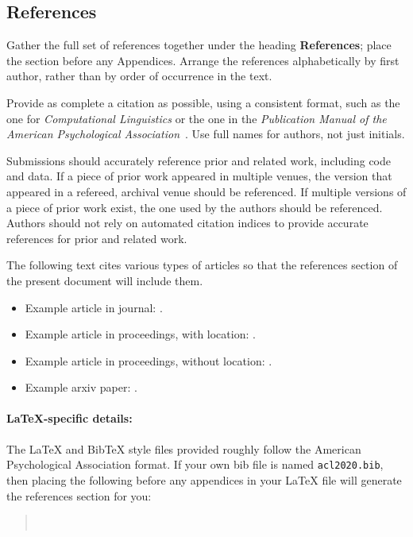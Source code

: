 \documentclass[11pt,a4paper]{article}
\begin{document}
\subsection{References}
Gather the full set of references together under the heading \textbf{References}; place the section before any Appendices. 
Arrange the references alphabetically by first author, rather than by order of occurrence in the text.

Provide as complete a citation as possible, using a consistent format, such as the one for \emph{Computational Linguistics\/} or the one in the  \emph{Publication Manual of the American 
Psychological Association\/}~\citep{APA:83}.
Use full names for authors, not just initials.

Submissions should accurately reference prior and related work, including code and data.
If a piece of prior work appeared in multiple venues, the version that appeared in a refereed, archival venue should be referenced.
If multiple versions of a piece of prior work exist, the one used by the authors should be referenced.
Authors should not rely on automated citation indices to provide accurate references for prior and related work.

The following text cites various types of articles so that the references section of the present document will include them.
\begin{itemize}
\item Example article in journal: \citep{Ando2005}.
\item Example article in proceedings, with location: \citep{borschinger-johnson-2011-particle}.
\item Example article in proceedings, without location: \citep{andrew2007scalable}.
\item Example arxiv paper: \citep{rasooli-tetrault-2015}. 
\end{itemize}


\paragraph{\LaTeX-specific details:}
The \LaTeX{} and Bib\TeX{} style files provided roughly follow the American Psychological Association format.
If your own bib file is named \texttt{\small acl2020.bib}, then placing the following before any appendices in your \LaTeX{}  file will generate the references section for you:
\begin{quote}\small
\verb||\\
\verb||
\end{quote}
\end{document}
